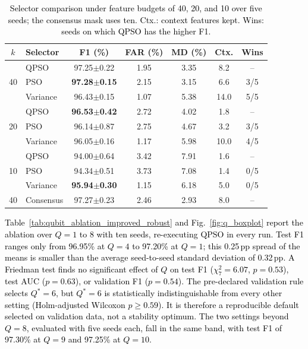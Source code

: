 \documentclass[conference]{IEEEtran}
\begin{document}
\begin{table}[!t]
\centering
\scriptsize
\caption{\textcolor{black}{Selector comparison under feature budgets of 40, 20, and 10 over five seeds; the consensus mask uses ten. Ctx.: context features kept. Wins: seeds on which QPSO has the higher F1.}}
\label{tab:kbudget}
\setlength{\tabcolsep}{3pt}
\begin{tabular}{clccccc}
\hline\toprule
$k$ & Selector & F1 (\%) & FAR (\%) & MD (\%) & Ctx. & Wins \\
\hline\toprule
\multirow{3}{*}{40} & QPSO & 97.25$\pm$0.22 & 1.95 & 3.35 & 8.2 & -- \\
 & PSO & \textbf{97.28$\pm$0.15} & 2.15 & 3.15 & 6.6 & 3/5 \\
 & Variance & 96.43$\pm$0.15 & 1.07 & 5.38 & 14.0 & 5/5 \\
\midrule
\multirow{3}{*}{20} & QPSO & \textbf{96.53$\pm$0.42} & 2.72 & 4.02 & 1.8 & -- \\
 & PSO & 96.14$\pm$0.87 & 2.75 & 4.67 & 3.2 & 3/5 \\
 & Variance & 96.05$\pm$0.16 & 1.17 & 5.98 & 10.0 & 4/5 \\
\midrule
\multirow{3}{*}{10} & QPSO & 94.00$\pm$0.64 & 3.42 & 7.91 & 1.6 & -- \\
 & PSO & 94.34$\pm$0.51 & 3.73 & 7.08 & 1.4 & 0/5 \\
 & Variance & \textbf{95.94$\pm$0.30} & 1.15 & 6.18 & 5.0 & 0/5 \\
\midrule
40 & Consensus & 97.27$\pm$0.23 & 2.46 & 2.93 & 8.0 & -- \\
\hline\toprule
\end{tabular}
\end{table}






\textcolor{black}{Table~\ref{tab:qubit_ablation_improved_robust}
and Fig.~\ref{fig:q_boxplot} report the ablation over $Q=1$ to 8 with
ten seeds, re-executing QPSO in every run. Test F1 ranges only from
96.95\% at $Q=4$ to 97.20\% at $Q=1$; this 0.25\,pp spread of the
means is smaller than the average seed-to-seed standard deviation of
0.32\,pp. A Friedman test finds no significant effect of $Q$ on test
F1 ($\chi^2_7=6.07$, $p=0.53$), test AUC ($p=0.63$), or validation F1
($p=0.54$). The pre-declared validation rule selects $Q^{*}=6$, but
$Q^{*}=6$ is statistically indistinguishable from every other setting
(Holm-adjusted Wilcoxon $p\ge0.59$). It is therefore a reproducible
default selected on validation data, not a stability optimum. The two
settings beyond $Q=8$, evaluated with five seeds each, fall in the same band,
with test F1 of 97.30\% at $Q=9$ and 97.25\% at $Q=10$.}
\end{document}
